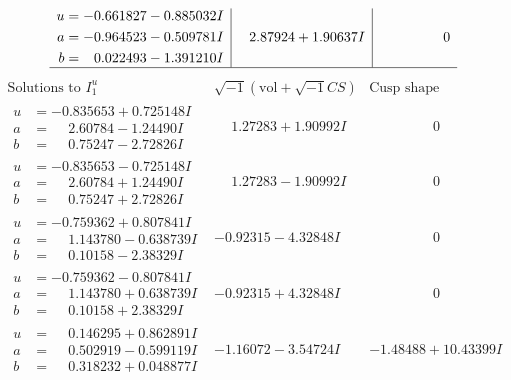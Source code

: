 \documentclass[1p]{elsarticle_modified}
\theoremstyle{definition}
\newcommand{\I}{\sqrt{-1}}
\begin{document}
$$\begin{array}{c|c|c}
\begin{aligned}
u &= -0.661827 - 0.885032 I \\
a &= -0.964523 - 0.509781 I \\
b &= \phantom{-}0.022493 - 1.391210 I\end{aligned}
 & \phantom{-}2.87924 + 1.90637 I & \phantom{-0.000000 } 0\\
 \hline 
 \end{array}$$\newpage$$\begin{array}{c|c|c}  
\text{Solutions to }I^u_{1}& \I (\text{vol} + \sqrt{-1}CS) & \text{Cusp shape}\\
 \hline 
\begin{aligned}
u &= -0.835653 + 0.725148 I \\
a &= \phantom{-}2.60784 - 1.24490 I \\
b &= \phantom{-}0.75247 - 2.72826 I\end{aligned}
 & \phantom{-}1.27283 + 1.90992 I & \phantom{-0.000000 } 0 \\ \hline\begin{aligned}
u &= -0.835653 - 0.725148 I \\
a &= \phantom{-}2.60784 + 1.24490 I \\
b &= \phantom{-}0.75247 + 2.72826 I\end{aligned}
 & \phantom{-}1.27283 - 1.90992 I & \phantom{-0.000000 } 0 \\ \hline\begin{aligned}
u &= -0.759362 + 0.807841 I \\
a &= \phantom{-}1.143780 - 0.638739 I \\
b &= \phantom{-}0.10158 - 2.38329 I\end{aligned}
 & -0.92315 - 4.32848 I & \phantom{-0.000000 } 0 \\ \hline\begin{aligned}
u &= -0.759362 - 0.807841 I \\
a &= \phantom{-}1.143780 + 0.638739 I \\
b &= \phantom{-}0.10158 + 2.38329 I\end{aligned}
 & -0.92315 + 4.32848 I & \phantom{-0.000000 } 0 \\ \hline\begin{aligned}
u &= \phantom{-}0.146295 + 0.862891 I \\
a &= \phantom{-}0.502919 - 0.599119 I \\
b &= \phantom{-}0.318232 + 0.048877 I\end{aligned}
 & -1.16072 - 3.54724 I & -1.48488 + 10.43399 I \\ \hline\begin{aligned}

\end{aligned}
\end{array}$$
\end{document}
